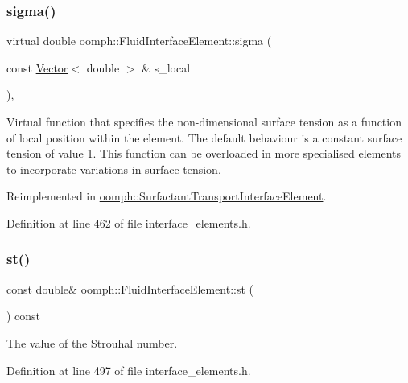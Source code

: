 \subsubsection{\texorpdfstring{sigma()}{sigma()}}
{\footnotesize\ttfamily virtual double oomph\+::\+Fluid\+Interface\+Element\+::sigma (\begin{DoxyParamCaption}\item[{const \hyperlink{classoomph_1_1Vector}{Vector}$<$ double $>$ \&}]{s\+\_\+local }\end{DoxyParamCaption})\hspace{0.3cm}{\ttfamily [inline]}, {\ttfamily [virtual]}}



Virtual function that specifies the non-\/dimensional surface tension as a function of local position within the element. The default behaviour is a constant surface tension of value 1. This function can be overloaded in more specialised elements to incorporate variations in surface tension. 



Reimplemented in \hyperlink{classoomph_1_1SurfactantTransportInterfaceElement_a1710057c610ccccc06ef41f34f086aae}{oomph\+::\+Surfactant\+Transport\+Interface\+Element}.



Definition at line 462 of file interface\+\_\+elements.\+h.

\mbox{\label{classoomph_1_1FluidInterfaceElement_a0c55c0e3cff597363ecb9ab0869c0015}} 
\subsubsection{\texorpdfstring{st()}{st()}}
{\footnotesize\ttfamily const double\& oomph\+::\+Fluid\+Interface\+Element\+::st (\begin{DoxyParamCaption}{ }\end{DoxyParamCaption}) const\hspace{0.3cm}{\ttfamily [inline]}}



The value of the Strouhal number. 



Definition at line 497 of file interface\+\_\+elements.\+h.

